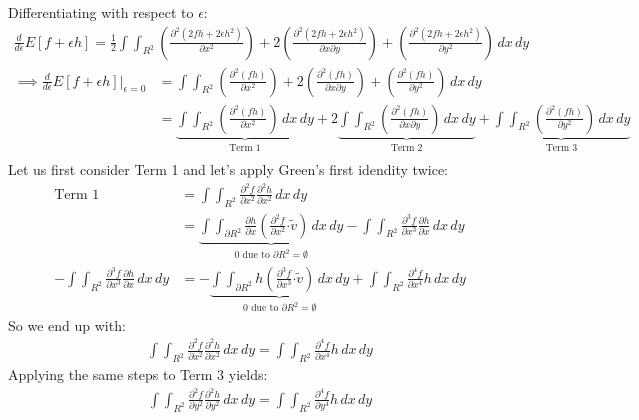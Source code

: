 \documentclass{article}
\begin{document}
Differentiating with respect to $\epsilon$:
\begin{align*}
	\frac{d}{d\epsilon}E\left[f+\epsilon h\right] = \frac{1}{2} \int \int_{R^2} \left(\frac{\partial^2(2f h + 2\epsilon h^2)}{\partial x^2}\right) + 2\left(\frac{\partial^2(2f h + 2\epsilon h^2)}{\partial x \partial y}\right) + \left(\frac{\partial^2(2f h + 2\epsilon h^2)}{\partial y^2}\right) \, dx\, dy
\end{align*}
\begin{align*}
	\implies \frac{d}{d\epsilon}E\left[f+\epsilon h\right]\Bigg|_{\epsilon=0} &= \int \int_{R^2} \left(\frac{\partial^2(f h)}{\partial x^2}\right) + 2\left(\frac{\partial^2(f h)}{\partial x \partial y}\right) + \left(\frac{\partial^2(f h)}{\partial y^2}\right) \, dx\, dy\\
	&= \underbrace{\int \int_{R^2} \left(\frac{\partial^2(f h)}{\partial x^2}\right) \, dx\, dy}_{\text{Term 1}} + 2\underbrace{\int \int_{R^2} \left(\frac{\partial^2(f h)}{\partial x \partial y}\right) \, dx\, dy}_{\text{Term 2}} + \underbrace{\int \int_{R^2} \left(\frac{\partial^2(f h)}{\partial y^2}\right) \, dx\, dy}_{\text{Term 3}}\\
\end{align*}
Let us first consider Term 1 and let's apply Green’s first idendity twice:
\begin{align*}
	\text{Term 1} &= \int \int_{R^2} \frac{\partial^2 f}{\partial x^2} \frac{\partial^2 h}{\partial x^2} \, dx\, dy\\
	&= \underbrace{\int \int_{\partial R^2} \frac{\partial h}{\partial x} \left (\frac{\partial^2 f}{\partial x^2} \boldsymbol{\cdot} \tilde{v}\right ) \, dx\, dy}_{0 \text{ due to } \partial R^2 = \emptyset} - \int \int_{R^2} \frac{\partial^3 f}{\partial x^3} \frac{\partial h}{\partial x} \, dx\, dy\\
	- \int \int_{R^2} \frac{\partial^3 f}{\partial x^3} \frac{\partial h}{\partial x} \, dx\, dy &= -\underbrace{\int \int_{\partial R^2} h \left (\frac{\partial^3 f}{\partial x^3} \boldsymbol{\cdot} \tilde{v}\right ) \, dx\, dy}_{0 \text{ due to } \partial R^2 = \emptyset} + \int \int_{R^2} \frac{\partial^4 f}{\partial x^4} h \, dx\, dy
\end{align*}
So we end up with:
\begin{align*}
	\int \int_{R^2} \frac{\partial^2 f}{\partial x^2} \frac{\partial^2 h}{\partial x^2} \, dx\, dy = \int \int_{R^2} \frac{\partial^4 f}{\partial x^4} h \, dx\, dy
\end{align*}
Applying the same steps to Term 3 yields:
\begin{align*}
	\int \int_{R^2} \frac{\partial^2 f}{\partial y^2} \frac{\partial^2 h}{\partial y^2} \, dx\, dy = \int \int_{R^2} \frac{\partial^4 f}{\partial y^4} h \, dx\, dy
\end{align*}
\end{document}
